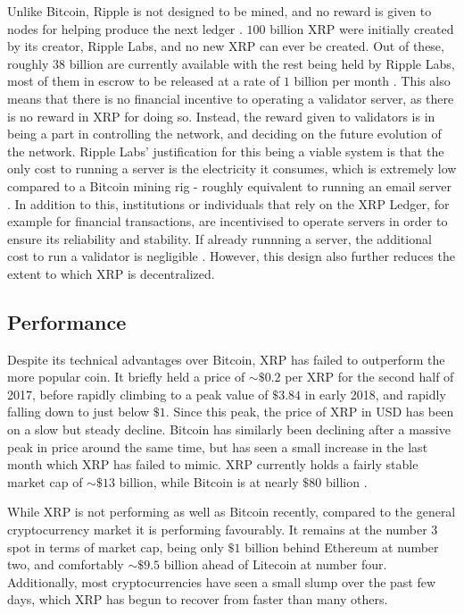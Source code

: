 \documentclass[11pt,a4paper]{article}
\begin{document}
	Unlike Bitcoin, Ripple is not designed to be mined, and no reward is given to nodes for helping produce the next ledger \cite{cointelegraph}. $100$ billion XRP were initially created by its creator, Ripple Labs, and no new XRP can ever be created. Out of these, roughly $38$ billion are currently available with the rest being held by Ripple Labs, most of them in escrow to be released at a rate of $1$ billion per month \cite{finder}. This also means that there is no financial incentive to operating a validator server, as there is no reward in XRP for doing so. Instead, the reward given to validators is in being a part in controlling the network, and deciding on the future evolution of the network. Ripple Labs' justification for this being a viable system is that the only cost to running a server is the electricity it consumes, which is extremely low compared to a Bitcoin mining rig - roughly equivalent to running an email server \cite{technicalFAQ}. In addition to this, institutions or individuals that rely on the XRP Ledger, for example for financial transactions, are incentivised to operate servers in order to ensure its reliability and stability. If already runnning a server, the additional cost to run a validator is negligible \cite{technicalFAQ}. However, this design also further reduces the extent to which XRP is decentralized.
	
	\subsection{Performance}
	
	Despite its technical advantages over Bitcoin, XRP has failed to outperform the more popular coin. It briefly held a price of $\sim\$0.2$ per XRP for the second half of 2017, before rapidly climbing to a peak value of $\$3.84$ in early 2018, and rapidly falling down to just below $\$1$. Since this peak, the price of XRP in USD has been on a slow but steady decline. Bitcoin has similarly been declining after a massive peak in price around the same time, but has seen a small increase in the last month which XRP has failed to mimic. XRP currently holds a fairly stable market cap of $\sim\$13$ billion, while Bitcoin is at nearly $\$80$ billion \cite{coinmarketcap}.
	
	While XRP is not performing as well as Bitcoin recently, compared to the general cryptocurrency market it is performing favourably. It remains at the number 3 spot in terms of market cap, being only $\$1$ billion behind Ethereum at number two, and comfortably $\sim\$9.5$ billion ahead of Litecoin at number four. Additionally, most cryptocurrencies have seen a small slump over the past few days, which XRP has begun to recover from faster than many others.
	
\end{document}
